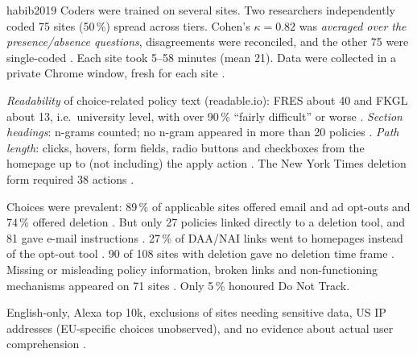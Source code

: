 \begin{papercard}{habib2019}
 Coders were trained on several sites. Two researchers independently coded 75 sites (50\,\%) spread across tiers. Cohen's $\kappa=0.82$ was \emph{averaged over the presence/absence questions}, disagreements were reconciled, and the other 75 were single-coded . Each site took 5--58 minutes (mean 21). Data were collected in a private Chrome window, fresh for each site .

 \emph{Readability} of choice-related policy text (readable.io): FRES about 40 and FKGL about 13, i.e.\ university level, with over 90\,\% ``fairly difficult'' or worse . \emph{Section headings}: n-grams counted; no n-gram appeared in more than 20 policies . \emph{Path length}: clicks, hovers, form fields, radio buttons and checkboxes from the homepage up to (not including) the apply action . The New York Times deletion form required 38 actions .

 Choices were prevalent: 89\,\% of applicable sites offered email and ad opt-outs and 74\,\% offered deletion . But only 27 policies linked directly to a deletion tool, and 81 gave e-mail instructions . 27\,\% of DAA/NAI links went to homepages instead of the opt-out tool . 90 of 108 sites with deletion gave no deletion time frame . Missing or misleading policy information, broken links and non-functioning mechanisms appeared on 71 sites . Only 5\,\% honoured Do Not Track.

 English-only, Alexa top 10k, exclusions of sites needing sensitive data, US IP addresses (EU-specific choices unobserved), and no evidence about actual user comprehension .


\end{papercard}
